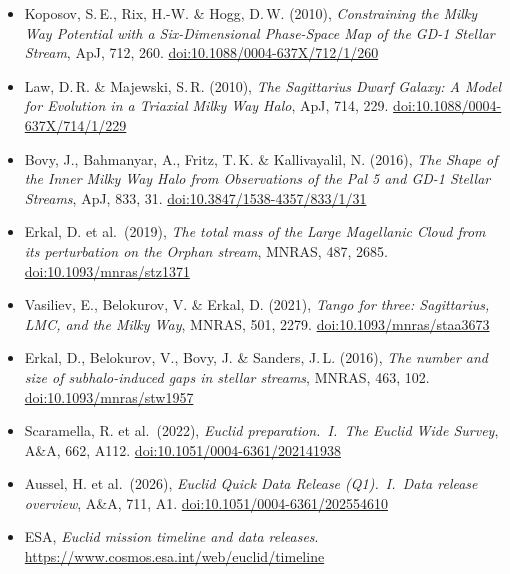 \documentclass[11pt,a4paper]{article}
\begin{document}
{\begin{itemize}[leftmargin=1.2em,itemsep=0.1em,parsep=0pt,topsep=0.3em]
\item Koposov, S.\,E., Rix, H.-W. \& Hogg, D.\,W. (2010), \emph{Constraining the Milky Way Potential with a Six-Dimensional Phase-Space Map of the GD-1 Stellar Stream}, ApJ, 712, 260. \href{https://doi.org/10.1088/0004-637X/712/1/260}{doi:10.1088/0004-637X/712/1/260}
\item Law, D.\,R. \& Majewski, S.\,R. (2010), \emph{The Sagittarius Dwarf Galaxy: A Model for Evolution in a Triaxial Milky Way Halo}, ApJ, 714, 229. \href{https://doi.org/10.1088/0004-637X/714/1/229}{doi:10.1088/0004-637X/714/1/229}
\item Bovy, J., Bahmanyar, A., Fritz, T.\,K. \& Kallivayalil, N. (2016), \emph{The Shape of the Inner Milky Way Halo from Observations of the Pal 5 and GD-1 Stellar Streams}, ApJ, 833, 31. \href{https://doi.org/10.3847/1538-4357/833/1/31}{doi:10.3847/1538-4357/833/1/31}
\item Erkal, D. et al.\ (2019), \emph{The total mass of the Large Magellanic Cloud from its perturbation on the Orphan stream}, MNRAS, 487, 2685. \href{https://doi.org/10.1093/mnras/stz1371}{doi:10.1093/mnras/stz1371}
\item Vasiliev, E., Belokurov, V. \& Erkal, D. (2021), \emph{Tango for three: Sagittarius, LMC, and the Milky Way}, MNRAS, 501, 2279. \href{https://doi.org/10.1093/mnras/staa3673}{doi:10.1093/mnras/staa3673}
\item Erkal, D., Belokurov, V., Bovy, J. \& Sanders, J.\,L. (2016), \emph{The number and size of subhalo-induced gaps in stellar streams}, MNRAS, 463, 102. \href{https://doi.org/10.1093/mnras/stw1957}{doi:10.1093/mnras/stw1957}
\item Scaramella, R. et al.\ (2022), \emph{Euclid preparation.\ I.\ The Euclid Wide Survey}, A\&A, 662, A112. \href{https://doi.org/10.1051/0004-6361/202141938}{doi:10.1051/0004-6361/202141938}
\item Aussel, H. et al.\ (2026), \emph{Euclid Quick Data Release (Q1).\ I.\ Data release overview}, A\&A, 711, A1. \href{https://doi.org/10.1051/0004-6361/202554610}{doi:10.1051/0004-6361/202554610}
\item ESA, \emph{Euclid mission timeline and data releases}. \url{https://www.cosmos.esa.int/web/euclid/timeline}
\end{itemize}
}
\end{document}
